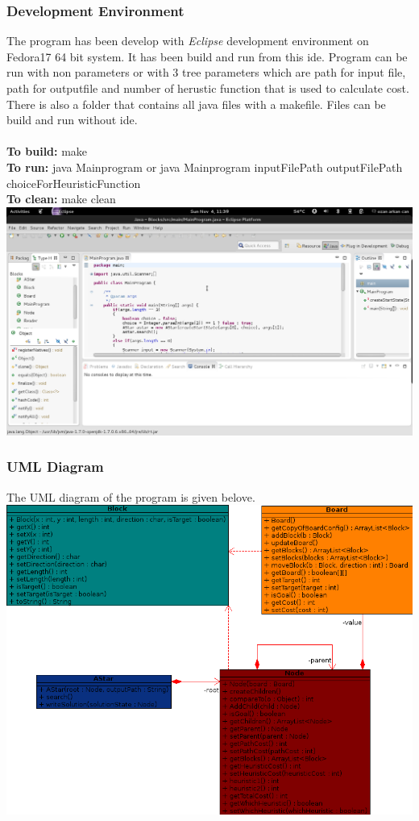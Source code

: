 \documentclass[a4paper,11pt]{report}
\begin{document}
\subsubsection*{Development Environment}
The program has been develop with \textit{Eclipse} development environment on Fedora17 64 bit system. 
It has been build and run from this ide. Program can be run with non parameters or with 3 tree parameters which are 
path for input file, path for outputfile and number of herustic function that is used to calculate cost.\\
There is also a folder that contains all java files with a makefile. Files can be build and run without ide.\\
\\
\textbf{To build:} make\\
\textbf{To run:} java Mainprogram or java Mainprogram inputFilePath outputFilePath choiceForHeuristicFunction\\
\textbf{To clean:} make clean\\

\includegraphics[scale=0.3]{develop}
\newpage
\subsubsection*{UML Diagram}

The UML diagram of the program is given belove.\\

\includegraphics[scale=0.6]{blocksUml}
\end{document}
